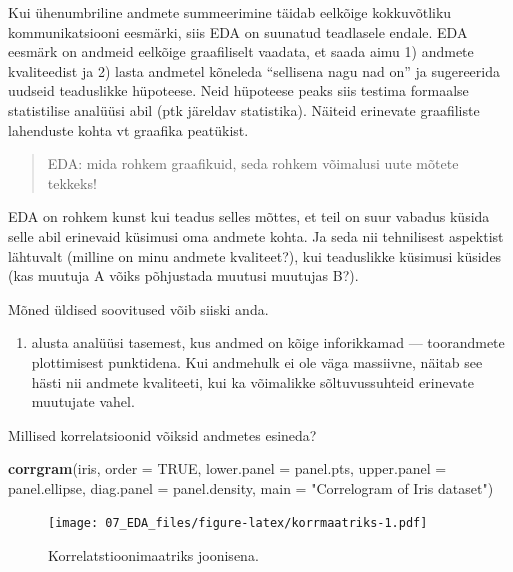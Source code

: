 \documentclass[]{book}
\newenvironment{Shaded}{\begin{snugshade}}{\end{snugshade}}
\newcommand{\DataTypeTok}[1]{\textcolor[rgb]{0.13,0.29,0.53}{#1}}
\newcommand{\KeywordTok}[1]{\textcolor[rgb]{0.13,0.29,0.53}{\textbf{#1}}}
\newcommand{\NormalTok}[1]{#1}
\newcommand{\OtherTok}[1]{\textcolor[rgb]{0.56,0.35,0.01}{#1}}
\newcommand{\StringTok}[1]{\textcolor[rgb]{0.31,0.60,0.02}{#1}}
\providecommand{\tightlist}{%
  \setlength{\itemsep}{0pt}\setlength{\parskip}{0pt}}
\begin{document}
Kui ühenumbriline andmete summeerimine täidab eelkõige kokkuvõtliku kommunikatsiooni eesmärki, siis EDA on suunatud teadlasele endale. EDA eesmärk on andmeid eelkõige graafiliselt vaadata, et saada aimu 1) andmete kvaliteedist ja 2) lasta andmetel kõneleda ``sellisena nagu nad on'' ja sugereerida uudseid teaduslikke hüpoteese. Neid hüpoteese peaks siis testima formaalse statistilise analüüsi abil (ptk järeldav statistika). Näiteid erinevate graafiliste lahenduste kohta vt graafika peatükist.

\begin{quote}
EDA: mida rohkem graafikuid, seda rohkem võimalusi uute mõtete tekkeks!
\end{quote}

EDA on rohkem kunst kui teadus selles mõttes, et teil on suur vabadus küsida selle abil erinevaid küsimusi oma andmete kohta. Ja seda nii tehnilisest aspektist lähtuvalt (milline on minu andmete kvaliteet?), kui teaduslikke küsimusi küsides (kas muutuja A võiks põhjustada muutusi muutujas B?).

Mõned üldised soovitused võib siiski anda.

\begin{enumerate}
\def\labelenumi{\arabic{enumi}.}
\tightlist
\item
  alusta analüüsi tasemest, kus andmed on kõige inforikkamad --- toorandmete plottimisest punktidena. Kui andmehulk ei ole väga massiivne, näitab see hästi nii andmete kvaliteeti, kui ka võimalikke sõltuvussuhteid erinevate muutujate vahel.
\end{enumerate}

Millised korrelatsioonid võiksid andmetes esineda?



\begin{Shaded}
\begin{Highlighting}[]
\KeywordTok{corrgram}\NormalTok{(iris, }
         \DataTypeTok{order =} \OtherTok{TRUE}\NormalTok{, }
         \DataTypeTok{lower.panel =}\NormalTok{ panel.pts,}
         \DataTypeTok{upper.panel =}\NormalTok{ panel.ellipse,}
         \DataTypeTok{diag.panel =}\NormalTok{ panel.density,}
         \DataTypeTok{main =} \StringTok{"Correlogram of Iris dataset"}\NormalTok{)}
\end{Highlighting}
\end{Shaded}

\begin{figure}
\centering
\texttt{[image: 07\_EDA\_files/figure-latex/korrmaatriks-1.pdf]}
\caption{\label{fig:korrmaatriks}Korrelatstioonimaatriks joonisena.}
\end{figure}
\end{document}

